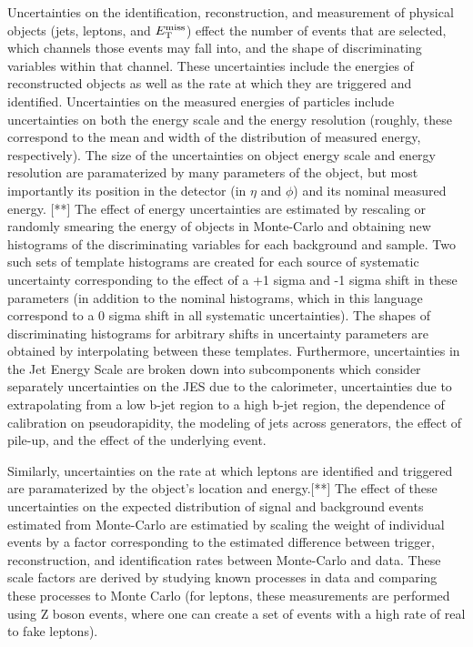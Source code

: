 Uncertainties on the identification, reconstruction, and measurement of physical objects (jets, leptons, and $E_{\mathrm{T}}^{\mathrm{miss}}$) effect the number of events that are selected, which channels those events may fall into, and the shape of discriminating variables within that channel.
These uncertainties include the energies of reconstructed objects as well as the rate at which they are triggered and identified.
Uncertainties on the measured energies of particles include uncertainties on both the energy scale and the energy resolution (roughly, these correspond to the mean and width of the distribution of measured energy, respectively).
The size of the uncertainties on object energy scale and energy resolution are paramaterized by many parameters of the object, but most importantly its position in the detector (in $\eta$ and $\phi$) and its nominal measured energy. [**]
The effect of energy uncertainties are estimated by rescaling or randomly smearing the energy of objects in Monte-Carlo and obtaining new histograms of the discriminating variables for each background and sample.
Two such sets of template histograms are created for each source of systematic uncertainty corresponding to the effect of a +1 sigma and -1 sigma shift in these parameters (in addition to the nominal histograms, which in this language correspond to a 0 sigma shift in all systematic uncertainties).
The shapes of discriminating histograms for arbitrary shifts in uncertainty parameters are obtained by interpolating between these templates.
Furthermore, uncertainties in the Jet Energy Scale are broken down into subcomponents which consider separately uncertainties on the JES due to the calorimeter, uncertainties due to extrapolating from a low b-jet region to a high b-jet region, the dependence of calibration on pseudorapidity, the modeling of jets across generators, the effect of pile-up, and the effect of the underlying event.

Similarly, uncertainties on the rate at which leptons are identified and triggered are paramaterized by the object's location and energy.[**]
The effect of these uncertainties on the expected distribution of signal and background events estimated from Monte-Carlo are estimatied by scaling the weight of individual events by a factor corresponding to the estimated difference between trigger, reconstruction, and identification rates between Monte-Carlo and data.
These scale factors are derived by studying known processes in data and comparing these processes to Monte Carlo (for leptons, these measurements are performed using Z boson events, where one can create a set of events with a high rate of real to fake leptons).

